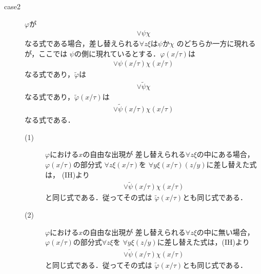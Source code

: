 \begin{metaprf}
\begin{description}
\begin{description}
					\item[case2] $\varphi$が
						\begin{align}
							\vee \psi \chi
						\end{align}
						なる式である場合，差し替えられる$\forall z \xi$は$\psi$か$\chi$
						のどちらか一方に現れるが，ここでは
						$\psi$の側に現れているとする．$\varphi(x/\tau)$は
						\begin{align}
							\vee \psi(x/\tau) \chi(x/\tau)
						\end{align}
						なる式であり，$\widetilde{\varphi}$は
						\begin{align}
							\vee \widetilde{\psi} \chi
						\end{align}
						なる式であり，$\widetilde{\varphi}(x/\tau)$は
						\begin{align}
							\vee \widetilde{\psi}(x/\tau) \chi(x/\tau)
						\end{align}
						なる式である．
						\begin{description}
							\item[(1)] $\varphi$における$x$の自由な出現が
								差し替えられる$\forall z \xi$の中にある場合，
								$\varphi(x/\tau)$の部分式
								$\forall z \xi(x/\tau)$を
								$\forall y \xi(x/\tau)(z/y)$に差し替えた式は，
								(IH)より
								\begin{align}
									\vee \widetilde{\psi}(x/\tau) \chi(x/\tau)
								\end{align}
								と同じ式である．従ってその式は
								$\widetilde{\varphi}(x/\tau)$とも同じ式である．
								
							\item[(2)] $\varphi$における$x$の自由な出現が
								差し替えられる$\forall z \xi$の中に無い場合，
								$\varphi(x/\tau)$の部分式$\forall z \xi$を
								$\forall y \xi(z/y)$に差し替えた式は，(IH)より
								\begin{align}
									\vee \widetilde{\psi}(x/\tau) \chi(x/\tau)
								\end{align}
								と同じ式である．従ってその式は
								$\widetilde{\varphi}(x/\tau)$とも同じ式である．
						\end{description}
						

\end{description}
\end{description}
\end{metaprf}
